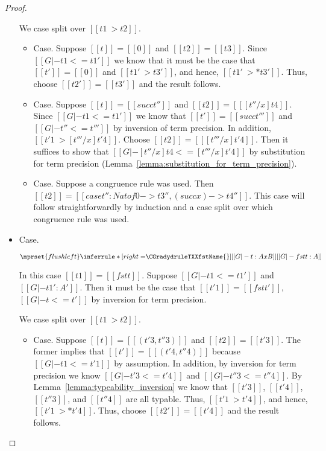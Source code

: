 \begin{proof}
\begin{itemize}
    We case split over $[[t1 ~> t2]]$.
    \begin{itemize}
    \item[] Case.  Suppose $[[t]] = [[0]]$ and $[[t2]] = [[t3]]$.  Since $[[G |- t1 <= t1']]$ we know that
      it must be the case that $[[t']] = [[0]]$ and $[[t1' ~> t3']]$, and hence,
      $[[t1' ~>* t3']]$.  Thus, choose $[[t2']] = [[t3']]$ and the result follows.
      
    \item[] Case.  Suppose $[[t]] = [[succ t'']]$ and $[[t2]] = [[ [t''/x]t4]]$.  Since $[[G |- t1 <= t1']]$
      we know that $[[t']] = [[succ t''']]$ and $[[G |- t'' <= t''']]$ by inversion of term precision. In addition,
      $[[t'1 ~> [t'''/x]t'4]]$. Choose $[[t2]] = [[ [t'''/x]t'4]]$.  Then it suffices to show that
      $[[G |- [t''/x]t4 <= [t'''/x]t'4]]$ by substitution for term precision (Lemma~\ref{lemma:substitution_for_term_precision}).            
      
    \item[] Case.  Suppose a congruence rule was used.  Then $[[t2]] = [[case t'' : Nat of 0 -> t3'', (succ x) -> t4'']]$.
      This case will follow straightforwardly by induction and a case split over which congruence rule was used.
      
    \end{itemize}   

  \item[] Case.\ \\ 
    \begin{center}
      \begin{math}
        $$\mprset{flushleft}
        \inferrule* [right=$\CGradydruleTXXfstName{}$] {
          [[G |- t : A x B]]
        }{[[G |- fst t : A]]}
      \end{math}
    \end{center}
    In this case $[[t1]] = [[fst t]]$.  Suppose $[[G |- t1 <= t1']]$ and $[[G |- t1' : A']]$.  Then
    it must be the case that $[[t'1]] = [[fst t']]$, $[[G |- t <= t']]$ by inversion for term
    precision.

    We case split over $[[t1 ~> t2]]$.
    \begin{itemize}
    \item[] Case. Suppose $[[t]] = [[(t'3,t''3)]]$ and $[[t2]] = [[t'3]]$.  The former implies
      that $[[t']] = [[(t'4,t''4)]]$ because $[[G |- t1 <= t'1]]$ by assumption.  In addition,
      by inversion for term precision we know $[[G |- t'3 <= t'4]]$ and $[[G |- t''3 <= t''4]]$.
      By Lemma~\ref{lemma:typeability_inversion} we know that $[[t'3]]$, $[[t'4]]$, $[[t''3]]$, and
      $[[t''4]]$ are all typable.  Thus, $[[t'1 ~> t'4]]$, and hence, $[[t'1 ~>* t'4]]$. Thus, choose
      $[[t2']] = [[t'4]]$ and the result follows.


\end{itemize}
\end{itemize}
\end{proof}
